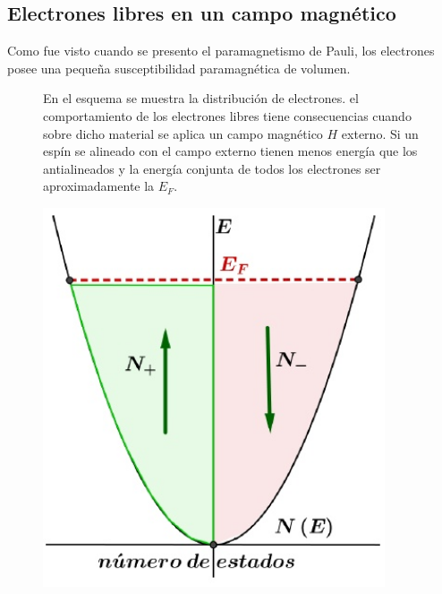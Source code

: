 \subsection{Electrones libres en un campo magnético}

Como fue visto cuando se presento el paramagnetismo de Pauli, los electrones posee una pequeña susceptibilidad paramagnética de volumen.

\begin{figure}[H]
  \begin{minipage}[b]{0.47\textwidth}
En el esquema se muestra la distribución de electrones. el comportamiento de los electrones libres tiene consecuencias cuando sobre dicho material se aplica un campo magnético $H$ externo. Si un espín se alineado con el campo externo tienen menos energía que los antialineados y la energía conjunta de todos los electrones ser aproximadamente la $E_{F}$.
  \vspace{0cm}
  \end{minipage}
  \hfill
  \begin{minipage}[b]{0.47\textwidth}
     \includegraphics[width=0.9\textwidth]{./Figures/fig345}
	\label{fig:345}
	  \vspace{0cm}
  \end{minipage}
\end{figure}


